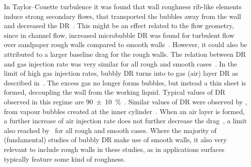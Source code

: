 \documentclass[aps,twocolumn,10pt,floatfix, superscriptaddress,longbibliography,pra]{revtex4-1}
\begin{document}
In Taylor--Couette turbulence it was found that wall roughness rib-like elements induce strong secondary flows, that transported the bubbles away from the wall and decreased the DR~\citep{vandenBerg2007,Verschoof2018}. This might be an effect related to the flow geometry, since in channel flow, increased microbubble DR was found for turbulent flow over sandpaper rough walls compared to smooth walls~\citep{Deutsch2004}. However, it could also be attributed to a larger baseline drag for the rough walls. The relation between DR and gas injection rate was very similar for all rough and smooth cases~\citep{Deutsch2004}. In the limit of high gas injection rates, bubbly DR turns into to gas (air) layer DR as described in~\cite{Elbing2008}. The excess gas no longer forms bubbles, but instead a thin sheet is formed, decoupling the wall from the working liquid. Typical values of DR observed in this regime are \SI{90 +- 10}{\percent}~\citep{Elbing2008}. Similar values of DR were observed by \cite{Saranadhi2016}, from vapour bubbles created at the inner cylinder~\citep{Saranadhi2016}. When an air layer is formed, a further increase of air injection rate does not further decrease the drag~\citep{Elbing2008}, a limit also reached by~\cite{Deutsch2004} for all rough and smooth cases. Where the majority of (fundamental) studies of bubbly DR make use of smooth walls, it also very relevant to include rough walls in these studies, as in applications surfaces typically feature some kind of roughness.
\end{document}
